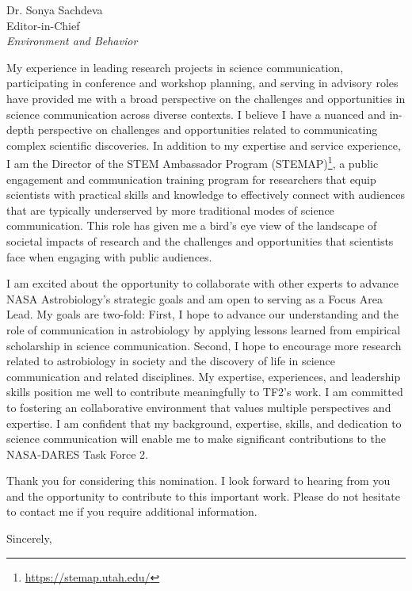\documentclass[12pt]{GUETletter}
\begin{document}
\begin{letter}{
               Dr. Sonya Sachdeva\\ 
               Editor-in-Chief\\
               \textit{Environment and Behavior}
               }
\vspace{1em}

My experience in leading research projects in science communication, participating in conference and workshop planning, and serving in advisory roles have provided me with a broad perspective on the challenges and opportunities in science communication across diverse contexts. I believe I have a nuanced and in-depth perspective on challenges and opportunities related to communicating complex scientific discoveries. In addition to my expertise and service experience, I am the Director of the STEM Ambassador Program (STEMAP)\footnote{\href{https://stemap.utah.edu/}{https://stemap.utah.edu/}}, a public engagement and communication training program for researchers that equip scientists with practical skills and knowledge to effectively connect with audiences that are typically underserved by more traditional modes of science communication. This role has given me a bird's eye view of the landscape of societal impacts of research and the challenges and opportunities that scientists face when engaging with public audiences.

\vspace{1em}

I am excited about the opportunity to collaborate with other experts to advance NASA Astrobiology's strategic goals and am open to serving as a Focus Area Lead. My goals are two-fold: First, I hope to advance our understanding and the role of communication in astrobiology by applying lessons learned from empirical scholarship in science communication. Second, I hope to encourage more research related to astrobiology in society and the discovery of life in science communication and related disciplines. My expertise, experiences, and leadership skills position me well to contribute meaningfully to TF2’s work. I am committed to fostering an collaborative environment that values multiple perspectives and expertise. I am confident that my background, expertise, skills, and dedication to science communication will enable me to make significant contributions to the NASA-DARES Task Force 2.

\vspace{1em}

Thank you for considering this nomination. I look forward to hearing from you and the opportunity to contribute to this important work. Please do not hesitate to contact me if you require additional information.

\closing{Sincerely,}

\end{letter}

\newpage

\printbibliography
\end{document}
